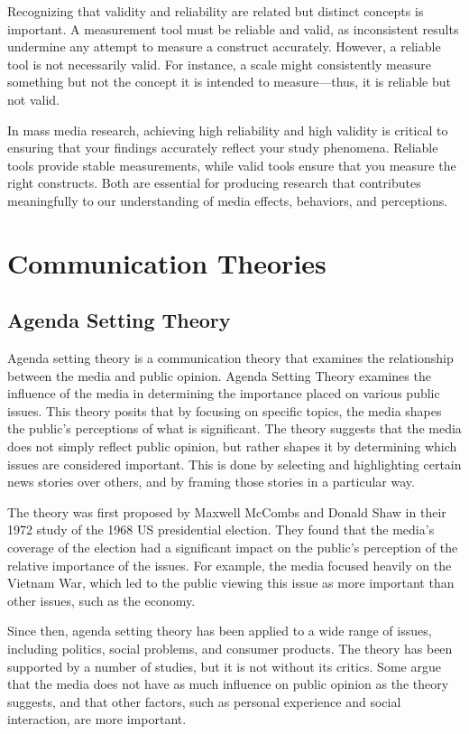 \documentclass[
]{book}
\begin{document}
Recognizing that validity and reliability are related but distinct concepts is important. A measurement tool must be reliable and valid, as inconsistent results undermine any attempt to measure a construct accurately. However, a reliable tool is not necessarily valid. For instance, a scale might consistently measure something but not the concept it is intended to measure---thus, it is reliable but not valid.

In mass media research, achieving high reliability and high validity is critical to ensuring that your findings accurately reflect your study phenomena. Reliable tools provide stable measurements, while valid tools ensure that you measure the right constructs. Both are essential for producing research that contributes meaningfully to our understanding of media effects, behaviors, and perceptions.

\chapter{Communication Theories}\label{communication-theories}

\section{Agenda Setting Theory}\label{agenda-setting-theory}

Agenda setting theory is a communication theory that examines the relationship between the media and public opinion. Agenda Setting Theory examines the influence of the media in determining the importance placed on various public issues. This theory posits that by focusing on specific topics, the media shapes the public's perceptions of what is significant. The theory suggests that the media does not simply reflect public opinion, but rather shapes it by determining which issues are considered important. This is done by selecting and highlighting certain news stories over others, and by framing those stories in a particular way.

The theory was first proposed by Maxwell McCombs and Donald Shaw in their 1972 study of the 1968 US presidential election. They found that the media's coverage of the election had a significant impact on the public's perception of the relative importance of the issues. For example, the media focused heavily on the Vietnam War, which led to the public viewing this issue as more important than other issues, such as the economy.

Since then, agenda setting theory has been applied to a wide range of issues, including politics, social problems, and consumer products. The theory has been supported by a number of studies, but it is not without its critics. Some argue that the media does not have as much influence on public opinion as the theory suggests, and that other factors, such as personal experience and social interaction, are more important.
\end{document}
